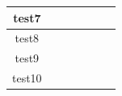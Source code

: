 \begin{table}[]
\begin{tabular}{|c|cc|cccc|}
    test7                   & \multicolumn{1}{c|}{}                                                      &                                                    & \multicolumn{1}{c|}{}                                                      & \multicolumn{1}{c|}{}                                                   & \multicolumn{1}{c|}{}                                                      &                                                    \\ \hline
    test8                   & \multicolumn{1}{c|}{}                                                      &                                                    & \multicolumn{1}{c|}{}                                                      & \multicolumn{1}{c|}{}                                                   & \multicolumn{1}{c|}{}                                                      &                                                    \\ \hline
    test9                   & \multicolumn{1}{c|}{}                                                      &                                                    & \multicolumn{1}{c|}{}                                                      & \multicolumn{1}{c|}{}                                                   & \multicolumn{1}{c|}{}                                                      &                                                    \\ \hline
    test10                  & \multicolumn{1}{c|}{}                                                      &                                                    & \multicolumn{1}{c|}{}                                                      & \multicolumn{1}{c|}{}                                                   & \multicolumn{1}{c|}{}                                                      &                                                    \\ \hline
    \end{tabular}
    \label{tab:other work}  %
    \end{table}



